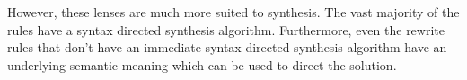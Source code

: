 However, these lenses are much more suited to synthesis.
The vast majority of the rules have a syntax directed synthesis algorithm.
Furthermore, even the rewrite rules that don't have an immediate syntax directed
synthesis algorithm have an underlying semantic meaning which can be used
to direct the solution.
